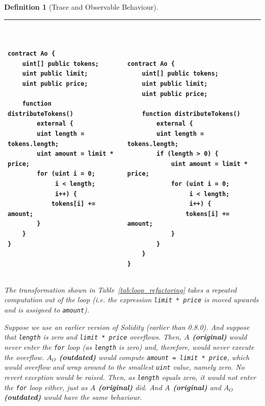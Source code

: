 \documentclass[manuscript,screen,review]{acmart}
\newtheorem{definition}{Definition}
\begin{document}
\begin{definition}[Trace and Observable Behaviour]
\begin{table}[htb]
\begin{footnotesize}
\begin{tabular}{|p{}|p{}|p{}|}
\begin{verbatim}
contract Ao {
    uint[] public tokens;
    uint public limit;
    uint public price;
    
    function distributeTokens() 
        external {
        uint length = tokens.length;
        uint amount = limit * price;
        for (uint i = 0; 
             i < length; 
             i++) {
            tokens[i] += amount;
        }
    }
}
\end{verbatim}
&
\vspace*{-0.5cm}
\begin{verbatim}



contract Ao {
    uint[] public tokens;
    uint public limit;
    uint public price;
    
    function distributeTokens() 
        external {
        uint length = tokens.length;
        if (length > 0) {
            uint amount = limit * price;
            for (uint i = 0; 
                 i < length; 
                 i++) {
                tokens[i] += amount;
            }
        }
    }
}
\end{verbatim}
\\ \hline
\end{tabular}
\end{footnotesize}
\end{table}

The transformation shown in Table~\ref{tab:loop_refactoring} takes a repeated computation out of the loop (i.e. the expression \texttt{limit * price} is moved upwards and is assigned to \texttt{amount}).

Suppose we use an earlier version of Solidity (earlier than 0.8.0). And suppose that \texttt{length} is zero and \texttt{limit * price} overflows. Then, {\bf $A$ (original)} would never enter the \texttt{for} loop (as \texttt{length} is zero) and, therefore, would never execute the overflow. {\bf $A_O$ (outdated)} would compute \texttt{amount = limit * price}, which would overflow and wrap around to the smallest \texttt{uint} value, namely zero. No revert exception would be raised. Then, as \texttt{length} equals zero, it would not enter the \texttt{for} loop either, just as {\bf $A$ (original)} did. And {\bf $A$ (original)} and {\bf $A_O$ (outdated)} would have the same behaviour.


\end{definition}
\end{document}
